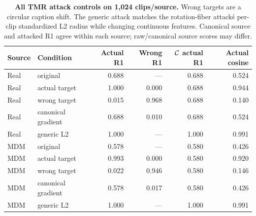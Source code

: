 \begin{table}[t]
\centering\small
\caption{\textbf{All TMR attack controls on 1,024 clips/source.} Wrong targets are a circular caption shift. The generic attack matches the rotation-fiber attack\'s per-clip standardized L2 radius while changing continuous features. Canonical source and attacked R1 agree within each source; raw/canonical source scores may differ.}\label{tab:tmrattackfull}
\begin{tabular}{@{}llrrrr@{}}\toprule
Source&Condition&Actual R1&Wrong R1&$\mathcal{C}$ actual R1&Actual cosine\\\midrule
Real&original&0.688&---&0.688&0.524\\
Real&actual target&1.000&0.000&0.688&0.944\\
Real&wrong target&0.015&0.968&0.688&0.140\\
Real&canonical gradient&0.688&0.010&0.688&0.524\\
Real&generic L2&1.000&---&1.000&0.991\\
MDM&original&0.578&---&0.580&0.426\\
MDM&actual target&0.993&0.000&0.580&0.920\\
MDM&wrong target&0.022&0.946&0.580&0.146\\
MDM&canonical gradient&0.578&0.017&0.580&0.426\\
MDM&generic L2&1.000&---&1.000&0.991\\
\bottomrule\end{tabular}\end{table}
